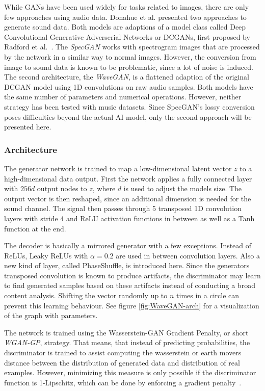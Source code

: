 \documentclass[12pt]{article}
\begin{document}
While GANs have been used widely for tasks related to images, there are only few approaches using audio data.
Donahue et al. presented two approaches to generate sound data.
Both models are adaptions of a model class called Deep Convolutional Generative Adverserial Networks or DCGANs, first proposed by Radford et al.~\cite{radford2015unsupervised}.
The \emph{SpecGAN} works with spectrogram images that are processed by the network in a similar way to normal images.
However, the conversion from image to sound data is known to be problematic, since a lot of noise is induced.
The second architecture, the \emph{WaveGAN}, is a flattened adaption of the original DCGAN model using 1D convolutions on raw audio samples.
Both models have the same number of parameters and numerical operations.
However, neither strategy has been tested with music datasets.
Since SpecGAN's lossy conversion poses difficulties beyond the actual AI model, only the second approach will be presented here.



\subsubsection{Architecture}
The generator network is trained to map a low-dimensional latent vector $z$ to a high-dimensional data output.
First the network applies a fully connected layer with $256d$ output nodes to $z$, where $d$ is used to adjust the models size.
The output vector is then reshaped, since an additional dimension is needed for the sound channel.
The signal then passes through 5 transposed 1D convolution layers with stride 4 and ReLU activation functions in between as well as a Tanh function at the end.

The decoder is basically a mirrored generator with a few exceptions.
Instead of ReLUs, Leaky ReLUs with $\alpha=0.2$ are used in between convolution layers.
Also a new kind of layer, called PhaseShuffle, is introduced here. 
Since the generators transposed convolution is known to produce artifacts, the discriminator may learn to find generated samples based on these artifacts instead of conducting a broad content analysis.
Shifting the vector randomly up to $n$ times in a circle can prevent this learning behaviour.
See figure \ref{fig:WaveGAN-arch} for a visualization of the graph with parameters.

The network is trained using the Wasserstein-GAN Gradient Penalty, or short \emph{WGAN-GP}, strategy.
That means, that instead of predicting probabilities, the discriminator is trained to assist computing the wasserstein or earth movers distance between the distribution of generated data and distribution of real examples.
However, minimizing this measure is only possible if the discriminator function is 1-Lipschitz, which can be done by enforcing a gradient penalty~\cite{gulrajani2017improved}.
\end{document}
